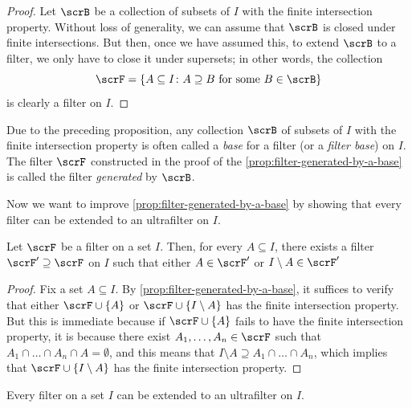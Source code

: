 \begin{proof}
  Let $\scrB$ be a collection of subsets of $I$ with the finite intersection property.
  Without loss of generality, we can assume that $\scrB$ is closed under finite intersections.
  But then, once we have assumed this, to extend $\scrB$ to a filter, we only have to close it under supersets;
  in other words, the collection
  \[
    \scrF=\{A\subseteq I \colon A\supseteq B
    \text{ for some $B\in \scrB$} \}
  \]
  is clearly a filter on $I$.
\end{proof}

Due to the preceding proposition, any collection $\scrB$ of subsets of $I$ with the finite intersection property is often called a \emph{base} for a filter (or a \emph{filter base}) on $I$.
The filter $\scrF$ constructed in the proof of the \cref{prop:filter-generated-by-a-base} is called the filter \emph{generated} by $\scrB$.

Now we want to improve \cref{prop:filter-generated-by-a-base} by showing that every filter can be extended to an ultrafilter on $I$.

\begin{proposition}
  \label{prop:ultrafilter-lemma}
  Let $\scrF$ be a filter on a set $I$.
  Then,  for every $A\subseteq I$, there exists a filter $\scrF'\supseteq \scrF$ on $I$ such that either $A\in \scrF'$ or $I\setminus A \in \scrF'$
\end{proposition}

\begin{proof}
  Fix a set $A\subseteq I$.
  By \cref{prop:filter-generated-by-a-base}, it suffices to verify that either $\scrF\cup\{A\}$ or $\scrF\cup\{I\setminus A\}$ has the finite intersection property.
  But this is immediate because if $\scrF\cup\{A\}$ fails to have the finite intersection property, it is because there exist $A_1,\dots, A_n\in \scrF$ such that
  $A_1 \cap\dots \cap A_n\cap A=\emptyset$, and this means that
  $I\setminus A\supseteq A_1 \cap\dots \cap A_n$,
  which implies that $\scrF\cup\{I\setminus A\}$ has the finite intersection property.
\end{proof}

\begin{corollary}
  \label{cor:ultrafilter-theorem}
  Every filter on a set $I$ can be extended to an ultrafilter on $I$.
\end{corollary}


